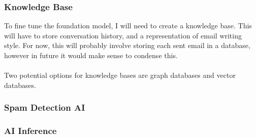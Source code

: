 \documentclass[../main.tex]{subfiles}
\begin{document}
\subsubsection{Knowledge Base}
To fine tune the foundation model, I will need to create a knowledge base. This will have to store conversation history, and a representation of email writing style. For now, this will probably involve storing each sent email in a database, however in future it would make sense to condense this.
\\\\
Two potential options for knowledge bases are graph databases and vector databases.

\subsubsection{Spam Detection AI}

\subsubsection{AI Inference}
\end{document}
